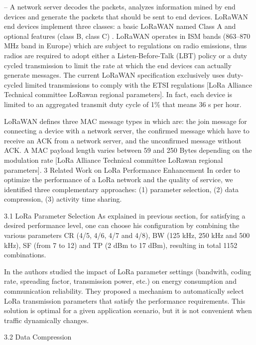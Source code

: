 – A network server decodes the packets,
	analyzes information mined by end devices and generate the packets that should be sent to end devices.
LoRaWAN end devices implement three classes:
	a basic LoRaWAN named Class A and optional features (class B,
	class C) \cite{LorawanSpecification}.
LoRaWAN operates in ISM bands (863–870 MHz band in Europe) which are subject to regulations on radio emissions,
	thus radios are required to adopt either a Listen-Before-Talk (LBT) policy or a duty cycled transmission to limit the rate at which the end devices can actually generate messages.
The current LoRaWAN specification exclusively uses duty-cycled limited transmissions to comply with the ETSI regulations [LoRa Alliance Technical committee LoRawan regional parameters].
In fact,
	each device is limited to an aggregated transmit duty cycle of 1\% that means 36 s per hour.

LoRaWAN defines three MAC message types in \cite{LorawanSpecification} which are:
the join message for connecting a device with a network server,
	the confirmed message which have to receive an ACK from a network server,
	and the unconfirmed message without ACK.
A MAC payload length varies between 59 and 250 Bytes depending on the modulation rate [LoRa Alliance Technical committee LoRawan regional parameters].
3 Related Work on LoRa Performance Enhancement In order to optimize the performance of a LoRa network and the quality of service,
	we identified three complementary approaches:
	(1) parameter selection,
	(2) data compression,
	(3) activity time sharing.


3.1 LoRa Parameter Selection As explained in previous section,
	for satisfying a desired performance level,
	one can choose his configuration by combining the various parameters CR (4/5, 4/6, 4/7 and 4/8),
	BW (125 kHz, 250 kHz and 500 kHz),
	SF (from 7 to 12) and TP (2 dBm to 17 dBm),
	resulting in total 1152 combinations.


In \cite{bor_lora_2017} the authors studied the impact of LoRa parameter settings (bandwith,
	coding rate,
	spreading factor,
	transmission power,
	etc.) on energy consumption and communication reliability.
They proposed a mechanism to automatically select LoRa transmission parameters that satisfy the performance requirements.
This solution is optimal for a given application scenario,
	but it is not convenient when traffic dynamically changes.

3.2 Data Compression 


